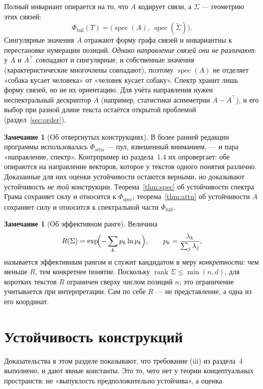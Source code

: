 \documentclass[11pt,a4paper]{article}
\theoremstyle{definition}
\newtheorem{remark}[definition]{Замечание}
\theoremstyle{plain}
\DeclareMathOperator{\spec}{spec}
\DeclareMathOperator{\rank}{rank}
\begin{document}
Полный инвариант опирается на то, что $A$ кодирует связи, а $\Sigma$ — геометрию этих связей:
\begin{equation}
\Phi_{\mathrm{full}}(T)=\bigl(\spec(A),\ \spec(\tilde\Sigma)\bigr).
\end{equation}
Сингулярные значения $A$ отражают форму графа связей и инвариантны к перестановке нумерации
позиций. \emph{Однако направление связей они не различают}: у $A$ и $A^\top$ совпадают и
сингулярные, и собственные значения (характеристические многочлены совпадают), поэтому
$\spec(A)$ не отделяет «собака кусает человека» от «человек кусает собаку». Спектр хранит
лишь форму связей, но не их ориентацию. Для учёта направления нужен неспектральный дескриптор
$A$ (например, статистики асимметрии $A-A^\top$), и его выбор при разной длине текста остаётся
открытой проблемой (раздел~\ref{sec:order}).

\begin{remark}[Об отвергнутых конструкциях]
В более ранней редакции программы использовалась $\Phi_{\mathrm{attn}}$ — пул, взвешенный
вниманием, — и пара «направление, спектр». Контрпример из раздела~1.4 их опровергает: обе
опираются на направление векторов, которое у текстов одного понятия различно. Доказанные для
них оценки устойчивости остаются верными, но доказывают устойчивость \emph{не той}
конструкции. Теорема~\ref{thm:spec} об устойчивости спектра Грама сохраняет силу и относится к
$\Phi_{\mathrm{spec}}$; теорема~\ref{thm:attn} об устойчивости $A$ сохраняет силу и относится к
спектральной части $\Phi_{\mathrm{full}}$.
\end{remark}

\begin{remark}[Об эффективном ранге]
Величина
\[
R(\Sigma)=\exp\!\Bigl(-\sum_k p_k\ln p_k\Bigr),\qquad p_k=\frac{\lambda_k}{\sum_j\lambda_j},
\]
называется эффективным рангом и служит кандидатом в меру \emph{конкретности}: чем меньше $R$, тем
конкретнее понятие. Поскольку $\rank\Sigma\le \min(n,d)$, для коротких текстов $R$ ограничен
сверху числом позиций $n$; это ограничение учитывается при интерпретации. Сам по себе $R$ — не
представление, а одна из его координат.
\end{remark}

\section{Устойчивость конструкций}\label{sec:stability}

Доказательства в этом разделе показывают, что требование (iii) из раздела~4 выполнено, и дают
явные константы. Это то, чего нет у теории концептуальных пространств: не «выпуклость
предположительно устойчива», а оценка.
\end{document}

